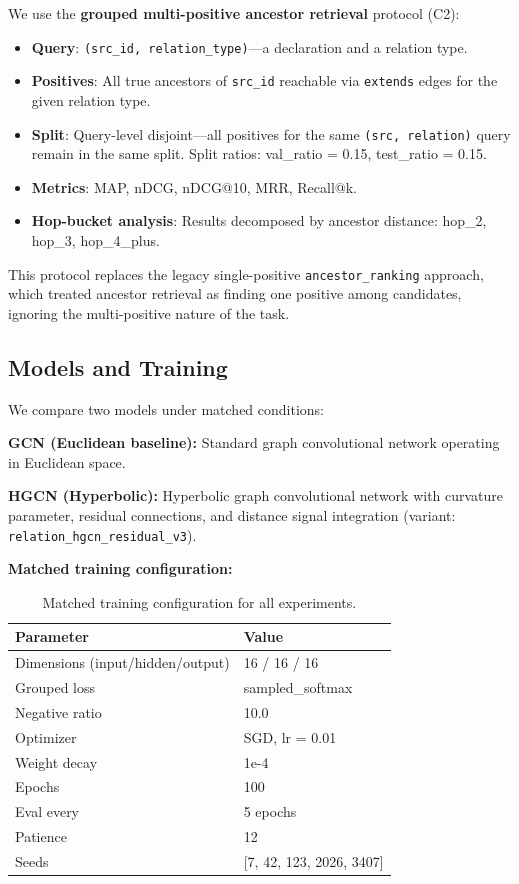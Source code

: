 \documentclass[runningheads]{llncs}
\begin{document}
We use the \textbf{grouped multi-positive ancestor retrieval} protocol (C2):
\begin{itemize}
\item \textbf{Query}: \texttt{(src\_id, relation\_type)}---a declaration and a relation type.
\item \textbf{Positives}: All true ancestors of \texttt{src\_id} reachable via \texttt{extends} edges for the given relation type.
\item \textbf{Split}: Query-level disjoint---all positives for the same \texttt{(src, relation)} query remain in the same split. Split ratios: val\_ratio = 0.15, test\_ratio = 0.15.
\item \textbf{Metrics}: MAP, nDCG, nDCG@10, MRR, Recall@k.
\item \textbf{Hop-bucket analysis}: Results decomposed by ancestor distance: hop\_2, hop\_3, hop\_4\_plus.
\end{itemize}

This protocol replaces the legacy single-positive \texttt{ancestor\_ranking} approach, which treated ancestor retrieval as finding one positive among candidates, ignoring the multi-positive nature of the task.

\subsection{Models and Training}

We compare two models under matched conditions:

\textbf{GCN (Euclidean baseline):} Standard graph convolutional network operating in Euclidean space.

\textbf{HGCN (Hyperbolic):} Hyperbolic graph convolutional network with curvature parameter, residual connections, and distance signal integration (variant: \texttt{relation\_hgcn\_residual\_v3}).

\textbf{Matched training configuration:}

\begin{table}[h]
\centering
\caption{Matched training configuration for all experiments.}
\label{tab:config}
\begin{tabular}{ll}
\toprule
Parameter & Value \\
\midrule
Dimensions (input/hidden/output) & 16 / 16 / 16 \\
Grouped loss & sampled\_softmax \\
Negative ratio & 10.0 \\
Optimizer & SGD, lr = 0.01 \\
Weight decay & 1e-4 \\
Epochs & 100 \\
Eval every & 5 epochs \\
Patience & 12 \\
Seeds & [7, 42, 123, 2026, 3407] \\
\bottomrule
\end{tabular}
\end{table}
\end{document}
